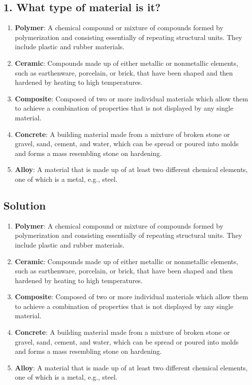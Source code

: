 \subsection*{1. What type of material is it?}
\begin{enumerate}
      \item \textbf{Polymer}: A chemical compound or mixture of compounds formed by polymerization and consisting essentially of repeating structural units. They include plastic and rubber materials.
      \item \textbf{Ceramic}: Compounds made up of either metallic or nonmetallic elements, such as earthenware, porcelain, or brick, that have been shaped and then hardened by heating to high temperatures.
      \item \textbf{Composite}: Composed of two or more individual materials which allow them to achieve a combination of properties that is not displayed by any single material.
      \item \textbf{Concrete}: A building material made from a mixture of broken stone or gravel, sand, cement, and water, which can be spread or poured into molds and forms a mass resembling stone on hardening.
      \item \textbf{Alloy}: A material that is made up of at least two different chemical elements, one of which is a metal, e.g., steel.
\end{enumerate}

\subsection*{Solution}
\begin{enumerate}
      \item \textbf{Polymer}: A chemical compound or mixture of compounds formed by polymerization and consisting essentially of repeating structural units. They include plastic and rubber materials.
      \item \textbf{Ceramic}: Compounds made up of either metallic or nonmetallic elements, such as earthenware, porcelain, or brick, that have been shaped and then hardened by heating to high temperatures.
      \item \textbf{Composite}: Composed of two or more individual materials which allow them to achieve a combination of properties that is not displayed by any single material.
      \item \textbf{Concrete}: A building material made from a mixture of broken stone or gravel, sand, cement, and water, which can be spread or poured into molds and forms a mass resembling stone on hardening.
      \item \textbf{Alloy}: A material that is made up of at least two different chemical elements, one of which is a metal, e.g., steel.
\end{enumerate}

